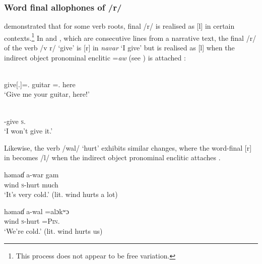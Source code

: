\subsubsection{Word final allophones of /r/}\label{sec:2.2.4.2}

\citet{FriesenMamalis2008} demonstrated that for some verb roots, final /r/ is realised as [l] in certain contexts.\footnote{This process does not appear to be free variation.} In  and , which are consecutive lines from a narrative text, the final /r/ of the verb /v r/\textit{ }‘give’ is [r] in  \textit{navar}\textit{ }‘I give’  but is realised as [l] when the indirect object pronominal enclitic =\textit{aw} (see ) is attached : 

\ea \label{ex:2:29}
\gll [vəl=aw                                  kɪndɛw    =aŋgʷɔ     na        ɛhɛ]\\
     {give[{\twoS}.{\IMP}]={\oneS}.{\IO}}      guitar    ={\twoS}.{\POSS}             {\PSP}  here\\
\glt  ‘Give me your guitar, here!’
\z

\ea \label{ex:2:30}
\\
      {\oneS}-give    \textsc{s}.{\DO}  {\NEG}\\
\glt  ‘I won’t give it.’  
\z

Likewise, the verb /wal/ ‘hurt’ exhibits similar changes, where the word-final [r] in  becomes /l/ when the indirect object pronominal enclitic attaches . 

\ea \label{ex:2:31}
\gll  həmaɗ   a-war   gam\\
      wind  \textsc{s}-hurt  much\\
\glt  ‘It’s very cold.’ (lit. wind hurts a lot)
\z

\ea \label{ex:2:32}
\gll  həmaɗ   a-wal                          =alɔkʷɔ\\
      wind  \textsc{s}-hurt  =\textsc{Pin}.{\IO}\\
\glt  ‘We’re cold.’ (lit. wind hurts us)
\z

